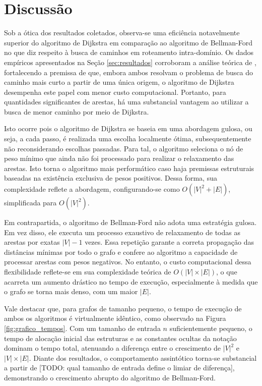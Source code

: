 \section{Discussão}

Sob a ótica dos resultados coletados, observa-se uma eficiência
notavelmente superior do algoritmo de Dijkstra em comparação ao
algoritmo de Bellman-Ford no que diz respeito à busca de caminhos em
roteamento intra-domínio. Os dados empíricos apresentados na Seção
\ref{sec:resultados} corroboram a análise teórica de
\cite{thippeswamy}, fortalecendo a premissa de que, embora ambos
resolvam o problema de busca do caminho mais curto a partir de uma
única origem, o algoritmo de Dijkstra desempenha este papel com menor
custo computacional. Portanto, para quantidades significantes de
arestas, há uma substancial vantagem ao utilizar a busca de menor
caminho por meio de Dijkstra.

Isto ocorre pois o algoritmo de Dijkstra se baseia em uma abordagem
gulosa, ou seja, a cada passo, é realizada uma escolha localmente
ótima, subsequentemente não reconsiderando escolhas passadas. Para
tal, o algoritmo seleciona o nó de peso mínimo que ainda não foi
processado para realizar o relaxamento das arestas. Isto torna o
algoritmo mais performático caso haja premissas estruturais baseadas
na existência exclusiva de pesos positivos. Dessa forma, sua
complexidade reflete a abordagem, configurando-se como
$O(|V|^2 + |E|)$, simplificada para $O(|V|^2)$.

Em contrapartida, o algoritmo de Bellman-Ford não adota uma
estratégia gulosa. Em vez disso, ele executa um processo exaustivo de
relaxamento de todas as arestas por exatas $|V| - 1$ vezes. Essa
repetição garante a correta propagação das distâncias mínimas por
todo o grafo e confere ao algoritmo a capacidade de processar arestas
com pesos negativos. No entanto, o custo computacional dessa
flexibilidade reflete-se em sua complexidade teórica de
$O(|V| \times |E|)$, o que acarreta um aumento drástico no
tempo de execução, especialmente à medida que o grafo se torna mais
denso, com um maior $|E|$.

Vale destacar que, para grafos de tamanho pequeno, o tempo de
execução de ambos os algoritmos é virtualmente idêntico, como
observado na Figura \ref{fig:grafico_tempos}. Com um tamanho de
entrada $n$ suficientemente pequeno, o tempo de alocação inicial das
estruturas e as constantes ocultas da notação dominam o tempo total,
atenuando a diferença entre o crescimento de $|V|^2$ e $|V| \times
|E|$. Diante dos resultados, o comportamento assintótico torna-se
substancial a partir de [TODO: qual tamanho de entrada define o
limiar de diferença], demonstrando o crescimento abrupto do algoritmo
de Bellman-Ford.

